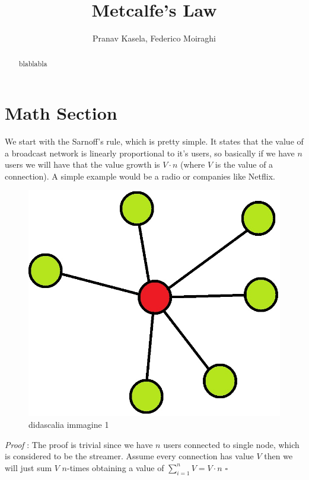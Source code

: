 \documentclass[12pt, a4page]{article}
\title{Metcalfe's Law}
\date{}
\author{Pranav Kasela, Federico Moiraghi}
\begin{document}
\maketitle
\begin{abstract}
blablabla
\end{abstract}
\newpage

\part*{Math Section}
We start with the Sarnoff's rule, which is pretty simple.
It states that the value of a broadcast network is linearly proportional to it's users, so basically if we have $n$ users we will have that the value growth is $V \cdot n$ (where $V$ is the value of a connection).
A simple example would be a radio or companies like Netflix.
\newline
\begin{figure}[htp]
\centering
\includegraphics[scale=1.00]{IMAGE1.jpg}
\caption{didascalia immagine 1}
\label{IMAGE1}
\end{figure}
\newline
\textit{Proof} : The proof is trivial since we have $n$ users connected to single node, which is considered to be the streamer.
Assume every connection has value $V$ then we will just sum $V$ $n$-times obtaining a value of $\sum_{i=1}^{n} V = V \cdot n$ \hfill $\square$
\newline
\newline
\end{document}
